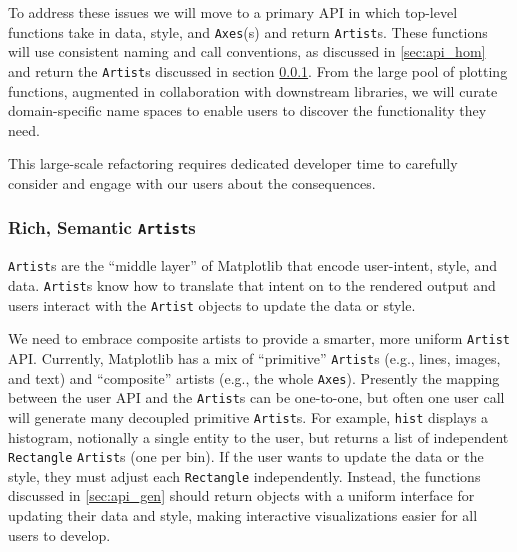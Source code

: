 \documentclass[11pt,letterpaper]{article}  %
\begin{document}
To address these issues we will move to a primary API in which
top-level functions take in data, style, and \texttt{Axes}(s) and
return \texttt{Artist}s.  These functions will use consistent naming
and call conventions, as discussed in \ref{sec:api_hom} and return the
\texttt{Artist}s discussed in section \ref{sec:artists}.  From the
large pool of plotting functions, augmented in collaboration with
downstream libraries, we will curate domain-specific name spaces to
enable users to discover the functionality they need.

This large-scale refactoring requires dedicated developer time to
carefully consider and engage with our users about the consequences.




\subsubsection{Rich, Semantic \texttt{Artist}s}
\label{sec:artists}
\texttt{Artist}s are the ``middle layer'' of Matplotlib that encode
user-intent, style, and data.  \texttt{Artist}s know how to
translate that intent on to the rendered output and
users interact with the \texttt{Artist}
objects to update the data or style.

We need to embrace composite artists
to provide a smarter, more uniform \texttt{Artist} API.
Currently, Matplotlib has a mix of ``primitive'' \texttt{Artist}s
(e.g., lines, images, and text) and ``composite'' artists (e.g.,
the whole \texttt{Axes}).
Presently the mapping between the user API and the \texttt{Artist}s can be
one-to-one, but often one user call will generate many decoupled
primitive \texttt{Artist}s.
For example, \texttt{hist} displays a histogram, notionally a single entity to the user,
but returns a list of independent \texttt{Rectangle} \texttt{Artist}s
(one per bin).
If the user wants to update the data or the style,
they must adjust each \texttt{Rectangle} independently.
Instead, the
functions discussed in \ref{sec:api_gen} should return objects with
a uniform interface for updating their data and style, making
interactive visualizations easier for all users to develop.
\end{document}
